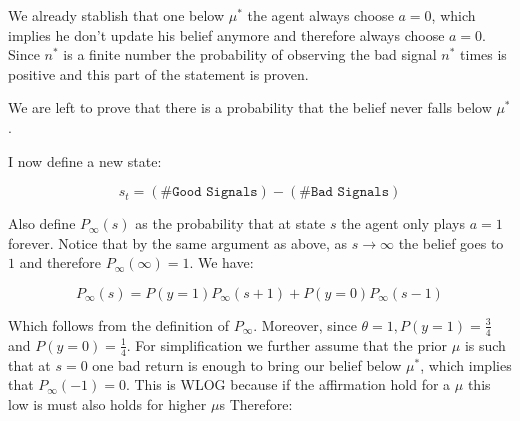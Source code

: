 \documentclass{article}
\begin{document}
We already stablish that one below $\mu^*$ the agent always choose $a = 0$, which implies
he don't update his belief anymore and therefore always choose $a = 0$. Since $n^*$ is a
finite number the probability of observing the bad signal $n^*$ times is positive and this
part of the statement is proven.

We are left to prove that there is a probability that the belief never falls below $\mu^*$.






I now define a new state:

\[
  s_t = (\texttt{\# Good Signals}) - (\texttt{\# Bad Signals})
\]


\newcommand{\Pn}{P_{\infty}}
Also define $\Pn(s)$ as the probability that at state $s$ the agent
only plays $a = 1$ forever. Notice that by the same argument as above, as
$s \to \infty$ the belief goes to $1$ and therefore $\Pn(\infty) = 1$.
We have:

\[
  \Pn(s) = P(y=1)\Pn(s+1) + P(y=0)\Pn(s-1)
\]

Which follows from the definition of $\Pn$. Moreover, since $\theta = 1,
P(y=1) = \frac{3}{4}$ and $P(y=0) = \frac{1}{4}$. For simplification we
further assume that the prior $\mu$ is such that at $s = 0$ one bad return
is enough to bring our belief below $\mu^*$, which implies that $\Pn(-1) = 0$.
This is WLOG because if the affirmation hold for a $\mu$ this low is must also
holds for higher $\mu$s
Therefore:
\end{document}
